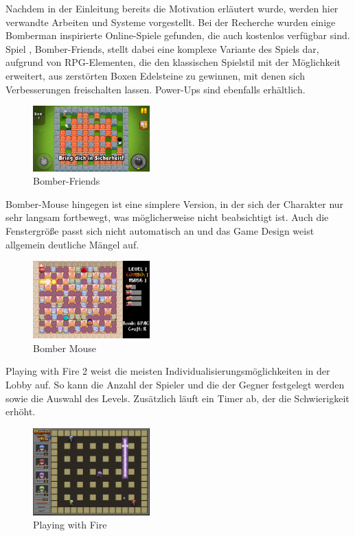 \documentclass[conference]{IEEEtran}
\begin{document}
Nachdem in der Einleitung bereits die Motivation erläutert wurde, werden hier verwandte Arbeiten und Systeme vorgestellt. Bei der Recherche wurden einige Bomberman inspirierte Online-Spiele gefunden, die auch kostenlos verfügbar sind. Spiel \cite{bombe-friends}, Bomber-Friends, stellt dabei eine komplexe Variante des Spiels dar, aufgrund von RPG-Elementen, die den klassischen Spielstil mit der Möglichkeit erweitert, aus zerstörten Boxen Edelsteine zu gewinnen, mit denen sich Verbesserungen freischalten lassen. Power-Ups sind ebenfalls erhältlich. 
\begin{figure}[H]
    \centering
    \includegraphics[width=0.4\textwidth]{res/bomberfriends.png}
    \caption{Bomber-Friends}
\end{figure}

Bomber-Mouse \cite{bombermouse} hingegen ist eine simplere Version, in der sich der Charakter nur sehr langsam fortbewegt, was möglicherweise nicht beabsichtigt ist. Auch die Fenstergröße passt sich nicht automatisch an und das Game Design weist allgemein deutliche Mängel auf.
\begin{figure}[H]
    \centering
    \includegraphics[width=0.4\textwidth]{res/bombermouse.png}
    \caption{Bomber Mouse}
\end{figure}

Playing with Fire 2 \cite{playingwithfire} weist die meisten Individualisierungsmöglichkeiten in der Lobby auf. So kann die Anzahl der Spieler und die der Gegner festgelegt werden sowie die Auswahl des Levels. Zusätzlich läuft ein Timer ab, der die Schwierigkeit erhöht. 
\begin{figure}[H]
    \centering
    \includegraphics[width=0.4\textwidth]{res/playing-with-fire.png}
    \caption{Playing with Fire}
\end{figure}
\end{document}
